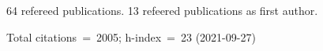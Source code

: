 64 refereed publications. 13 refeered publications as first author.

Total citations~=~2005; h-index~=~23 (2021-09-27)